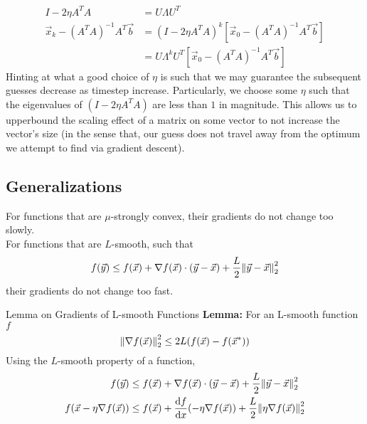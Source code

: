 \begin{align*}
    I - 2 \eta A^T A &= U \Lambda U^T \\
    \vec{x}_k - {(A^T A)}^{-1} A^T \vec{b}
    &= {(I - 2 \eta A^T A)}^k [\vec{x}_0 - {(A^T A)}^{-1} A^T \vec{b}] \\
    &= U \Lambda^k U^T [\vec{x}_0 - {(A^T A)}^{-1} A^T \vec{b}]
\end{align*}
Hinting at what a good choice of $\eta$ is such that we may guarantee the subsequent guesses decrease as timestep increase.
Particularly, we choose some $\eta$ such that the eigenvalues of $(I - 2 \eta A^T A)$ are less than $1$ in magnitude.
This allows us to upperbound the scaling effect of a matrix on some vector to not increase the vector's size (in the sense that, our guess does not travel away from the optimum we attempt to find via gradient descent).

\subsection{Generalizations}
For functions that are $\mu$-strongly convex, their gradients do not change too slowly. \\
For functions that are $L$-smooth, such that
\[
    f(\vec{y}) \leq f(\vec{x}) + \nabla f(\vec{x}) \cdot (\vec{y} - \vec{x}) + \frac{L}{2} \pnorm[2]{\vec{y} - \vec{x}}{2}
\]
their gradients do not change too fast.

\begin{ln-theorem}{Lemma on Gradients of L-smooth Functions}{}
    \textbf{Lemma:} For an L-smooth function $f$
    \[
        \pnorm[2]{\nabla f(\vec{x})}{2} \leq 2L (f(\vec{x}) - f(\vec{x}^*))
    \]
    \tcblower
    Using the $L$-smooth property of a function,
    \begin{align*}
        f(\vec{y})
        &\leq f(\vec{x}) + \nabla f(\vec{x}) \cdot (\vec{y} - \vec{x}) + \frac{L}{2} \pnorm[2]{\vec{y} - \vec{x}}{2} \\
        f(\vec{x} - \eta \nabla f(\vec{x}))
        &\leq f(\vec{x}) + \dv{f}{x} {} (-\eta \nabla f(\vec{x})) + \frac{L}{2} \pnorm[2]{\eta \nabla f(\vec{x})}{2}
    \end{align*}
\end{ln-theorem}
